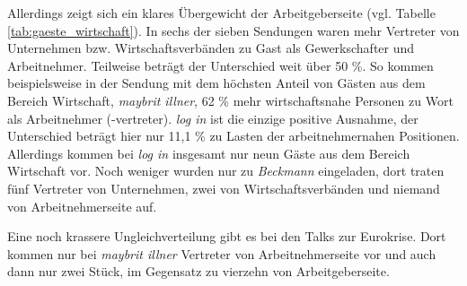 Allerdings zeigt sich ein klares Übergewicht der Arbeitgeberseite (vgl. Tabelle \vref{tab:gaeste_wirtschaft}). In sechs der sieben Sendungen waren mehr Vertreter von Unternehmen bzw. Wirtschaftsverbänden zu Gast als Gewerkschafter und Arbeitnehmer. Teilweise beträgt der Unterschied weit über 50 \%. So kommen beispielsweise in der Sendung mit dem höchsten Anteil von Gästen aus dem Bereich Wirtschaft, \textit{maybrit illner}, 62 \% mehr wirtschaftsnahe Personen zu Wort als Arbeitnehmer (-vertreter). \textit{log in} ist die einzige positive Ausnahme, der Unterschied beträgt hier nur 11,1 \% zu Lasten der arbeitnehmernahen Positionen. Allerdings kommen bei \textit{log in} insgesamt nur neun Gäste aus dem Bereich Wirtschaft vor. Noch weniger wurden nur zu \textit{Beckmann} eingeladen, dort traten fünf Vertreter von Unternehmen, zwei von Wirtschaftsverbänden und niemand von Arbeitnehmerseite auf.

Eine noch krassere Ungleichverteilung gibt es bei den Talks zur Eurokrise. Dort kommen nur bei \textit{maybrit illner} Vertreter von Arbeitnehmerseite vor und auch dann nur zwei Stück, im Gegensatz zu vierzehn von Arbeitgeberseite.

